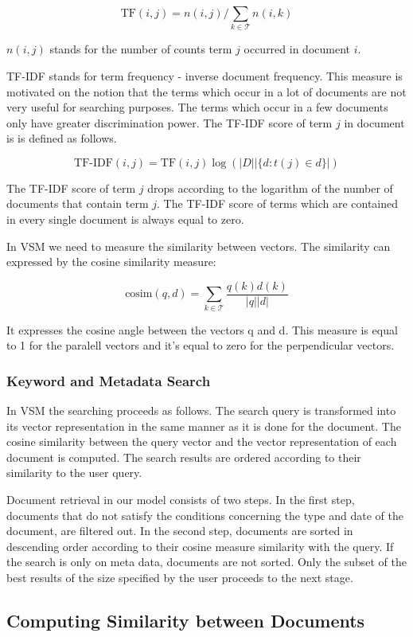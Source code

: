 \[\text{TF}(i,j) = n(i,j) / \sum_{k \in \mathcal{T}}{n(i,k)}\]


$n(i,j)$ stands for the number of counts term $j$ occurred in document $i$.


TF-IDF stands for term frequency - inverse document frequency. This measure is motivated on the notion that the terms which occur in a lot of documents are not very useful for searching purposes. The terms which occur in a few documents only have greater discrimination power. The TF-IDF score of term $j$ in document is is defined as follows.

\[\text{TF-IDF}(i,j) = \text{TF}(i,j)\log{(|D| |\lbrace d : t(j) \in d \rbrace|)}\]

The TF-IDF score of term $j$ drops according to the logarithm of the number of documents that contain term $j$. The TF-IDF score of terms which are contained in every single document is always equal to zero.

In VSM we need to measure the similarity between vectors. The similarity can expressed by the cosine similarity measure:

\[\text{cosim}(q,d) = \sum_{k \in \mathcal{T}}\frac{q(k)d(k)}{|q||d|}\]

It expresses the cosine angle between the vectors q and d. This measure is equal to 1 for the paralell vectors and it's equal to zero for the perpendicular vectors.

\subsubsection{Keyword and Metadata Search}\label{sec:keyword_search}

In VSM the searching proceeds as follows. The search query is transformed into its vector representation in the same manner as it is done for the document. The cosine similarity between the query vector and the vector representation of each document is computed. The search results are ordered according to their similarity to the user query. 

Document retrieval in our model consists of two steps. In the first step, documents that do not satisfy the conditions concerning the type and date of the document, are filtered out. In the second step, documents are sorted in descending order according to their cosine measure similarity with the query. If the search is only on meta data, documents are not sorted. Only the subset of the best results of the size specified by the user proceeds to the next stage.

\subsection{Computing Similarity between Documents}\label{sec:computing_similarity_between_documents}
%

